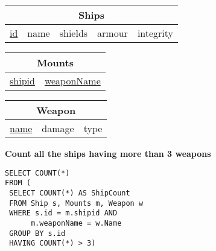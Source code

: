 \documentclass{beamer}
\begin{document}
\begin{frame}[fragile]

\begin{tabular}{|c|c|c|c|c|}
\hline
\multicolumn{5}{|c|}{\textbf{Ships}} \\
\hline
\underline{id} & name & shields & armour & integrity \\
\hline
\end{tabular}

\begin{tabular}{|c|c|}
\hline
\multicolumn{2}{|c|}{\textbf{Mounts}} \\
\hline
\underline{shipid} & \underline{weaponName} \\
\hline
\end{tabular}

\begin{tabular}{|c|c|c|}
\hline
\multicolumn{3}{|c|}{\textbf{Weapon}} \\
\hline
\underline{name} & damage & type \\
\hline
\end{tabular}

\vspace{0.25cm}
\textbf{Count all the ships having more than 3 weapons}

\pause
\begin{lstlisting}[showstringspaces=false]
SELECT COUNT(*)
FROM (
 SELECT COUNT(*) AS ShipCount
 FROM Ship s, Mounts m, Weapon w
 WHERE s.id = m.shipid AND 
      m.weaponName = w.Name
 GROUP BY s.id
 HAVING COUNT(*) > 3)
                   
\end{lstlisting}

\end{frame}
\end{document}
